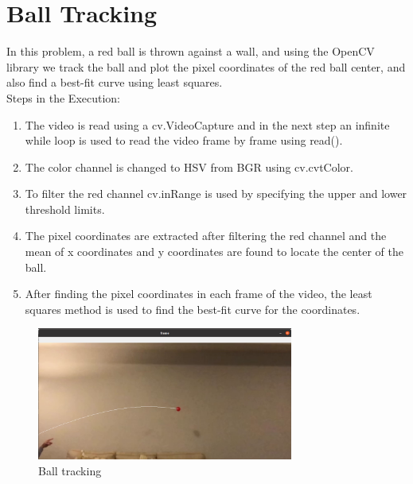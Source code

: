 \section{Ball Tracking}
   In this problem, a red ball is thrown against a wall, and using the OpenCV library we track the ball and plot the pixel coordinates of the red ball center, and also find a best-fit curve using least squares.\\
   Steps in the Execution:
   \begin{enumerate}
       \item The video is read using a cv.VideoCapture and in the next step an infinite while loop is used to read the video frame by frame using read().
       \item The color channel is changed to HSV from BGR using cv.cvtColor.
       \item To filter the red channel cv.inRange is used by specifying the upper and lower threshold limits.
       \item The pixel coordinates are extracted after filtering the red channel and the mean of x coordinates and y coordinates are found to locate the center of the ball.
       \item After finding the pixel coordinates in each frame of the video, the least squares method is used to find the best-fit curve for the coordinates.
   \end{enumerate} 

\begin{figure}[h]
    \centering
    \includegraphics[width=0.75\textwidth]{txt/Proj1_balltrack.png}
    \caption{Ball tracking}
    \label{fig:my_label}
\end{figure}
